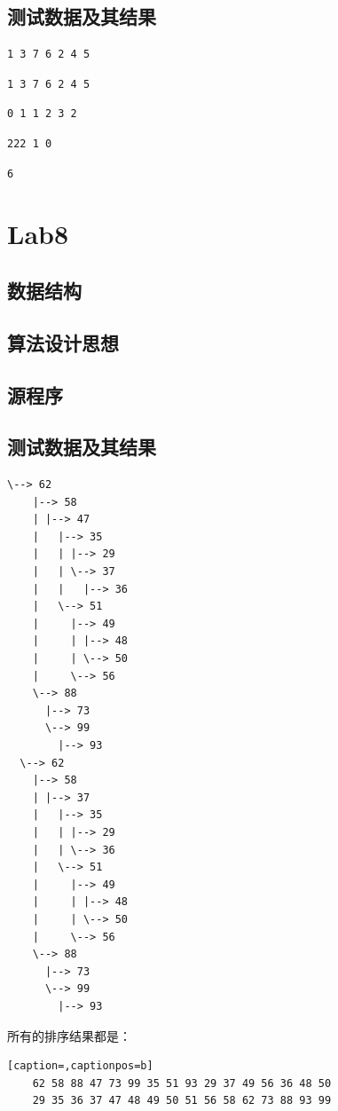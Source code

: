 \documentclass[a4paper,11pt,UTF8]{ctexart}
\begin{document}
\subsection{测试数据及其结果}
\begin{lstlisting}[caption=1DFS.cpp,captionpos=b]
    1 3 7 6 2 4 5
\end{lstlisting}
\begin{lstlisting}[caption=1BFS.cpp,captionpos=b]
    1 3 7 6 2 4 5
\end{lstlisting}
\begin{lstlisting}[caption=2Dijkstra.cpp,captionpos=b]
    0 1 1 2 3 2
\end{lstlisting}
\begin{lstlisting}[caption=3CSP.cpp,captionpos=b]
    222 1 0
\end{lstlisting}
\begin{lstlisting}[caption=4CSP.cpp,captionpos=b]
    6
\end{lstlisting}

\section{Lab8}
\subsection{数据结构}
\subsection{算法设计思想}
\subsection{源程序}
\subsection{测试数据及其结果}
\begin{lstlisting}[caption=1BinarySortTree.cpp,captionpos=b]
    \--> 62
    |--> 58
    | |--> 47
    |   |--> 35
    |   | |--> 29
    |   | \--> 37
    |   |   |--> 36
    |   \--> 51
    |     |--> 49
    |     | |--> 48
    |     | \--> 50
    |     \--> 56
    \--> 88
      |--> 73
      \--> 99
        |--> 93
  \--> 62
    |--> 58
    | |--> 37
    |   |--> 35
    |   | |--> 29
    |   | \--> 36
    |   \--> 51
    |     |--> 49
    |     | |--> 48
    |     | \--> 50
    |     \--> 56
    \--> 88
      |--> 73
      \--> 99
        |--> 93
\end{lstlisting}
所有的排序结果都是：
\begin{lstlisting}[caption=,captionpos=b]
    62 58 88 47 73 99 35 51 93 29 37 49 56 36 48 50
    29 35 36 37 47 48 49 50 51 56 58 62 73 88 93 99
\end{lstlisting}
\end{document}
